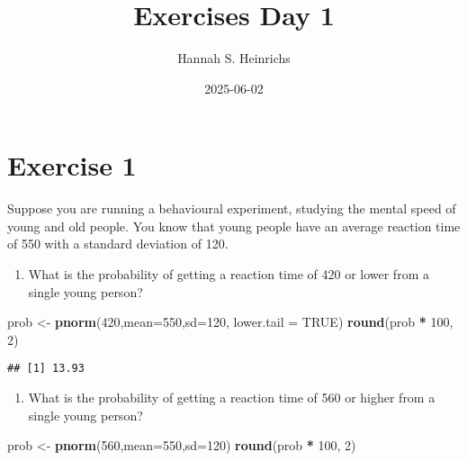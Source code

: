 \documentclass[
]{article}
\title{Exercises Day 1}
\author{Hannah S. Heinrichs}
\date{2025-06-02}
\newenvironment{Shaded}{\begin{snugshade}}{\end{snugshade}}
\newcommand{\AttributeTok}[1]{\textcolor[rgb]{0.13,0.29,0.53}{#1}}
\newcommand{\ConstantTok}[1]{\textcolor[rgb]{0.56,0.35,0.01}{#1}}
\newcommand{\DecValTok}[1]{\textcolor[rgb]{0.00,0.00,0.81}{#1}}
\newcommand{\FunctionTok}[1]{\textcolor[rgb]{0.13,0.29,0.53}{\textbf{#1}}}
\newcommand{\NormalTok}[1]{#1}
\newcommand{\OtherTok}[1]{\textcolor[rgb]{0.56,0.35,0.01}{#1}}
\newcommand{\SpecialCharTok}[1]{\textcolor[rgb]{0.81,0.36,0.00}{\textbf{#1}}}
\providecommand{\tightlist}{%
  \setlength{\itemsep}{0pt}\setlength{\parskip}{0pt}}
\begin{document}
\maketitle

\hypertarget{exercise-1}{%
\section{Exercise 1}\label{exercise-1}}

Suppose you are running a behavioural experiment, studying the mental
speed of young and old people. You know that young people have an
average reaction time of 550 with a standard deviation of 120.

\begin{enumerate}
\def\labelenumi{\alph{enumi})}
\tightlist
\item
  What is the probability of getting a reaction time of 420 or lower
  from a single young person?
\end{enumerate}

\begin{Shaded}
\begin{Highlighting}[]
\NormalTok{prob }\OtherTok{\textless{}{-}} \FunctionTok{pnorm}\NormalTok{(}\DecValTok{420}\NormalTok{,}\AttributeTok{mean=}\DecValTok{550}\NormalTok{,}\AttributeTok{sd=}\DecValTok{120}\NormalTok{, }\AttributeTok{lower.tail =} \ConstantTok{TRUE}\NormalTok{)}
\FunctionTok{round}\NormalTok{(prob }\SpecialCharTok{*} \DecValTok{100}\NormalTok{, }\DecValTok{2}\NormalTok{)}
\end{Highlighting}
\end{Shaded}

\begin{verbatim}
## [1] 13.93
\end{verbatim}

\begin{enumerate}
\def\labelenumi{\alph{enumi})}
\setcounter{enumi}{1}
\tightlist
\item
  What is the probability of getting a reaction time of 560 or higher
  from a single young person?
\end{enumerate}

\begin{Shaded}
\begin{Highlighting}[]
\NormalTok{prob }\OtherTok{\textless{}{-}} \FunctionTok{pnorm}\NormalTok{(}\DecValTok{560}\NormalTok{,}\AttributeTok{mean=}\DecValTok{550}\NormalTok{,}\AttributeTok{sd=}\DecValTok{120}\NormalTok{)}
\FunctionTok{round}\NormalTok{(prob }\SpecialCharTok{*} \DecValTok{100}\NormalTok{, }\DecValTok{2}\NormalTok{)}
\end{Highlighting}
\end{Shaded}
\end{document}
